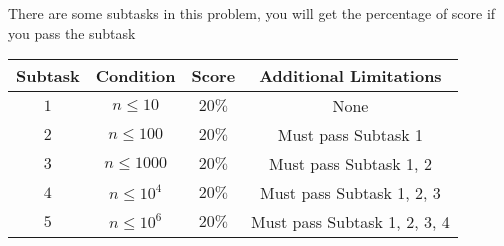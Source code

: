 There are some subtasks in this problem, you will get the percentage of score if you pass the subtask

\begin{center}
  \begin{tabular}{ | c | c | c | c | } \hline
    \bf{Subtask} &
    \bf{Condition} &
    \bf{Score} &
    \bf{Additional Limitations} \\ \hline
    $1$ & $n \le 10$ & $20\%$ & None \\ \hline
    $2$ & $n \le 100$ & $20\%$ & Must pass Subtask 1 \\ \hline
    $3$ & $n \le 1000$ & $20\%$ & Must pass Subtask 1, 2 \\ \hline
    $4$ & $n \le 10^4$ & $20\%$ & Must pass Subtask 1, 2, 3 \\ \hline
    $5$ & $n \le 10^6$ & $20\%$ & Must pass Subtask 1, 2, 3, 4 \\ \hline
    \end{tabular}
\end{center}